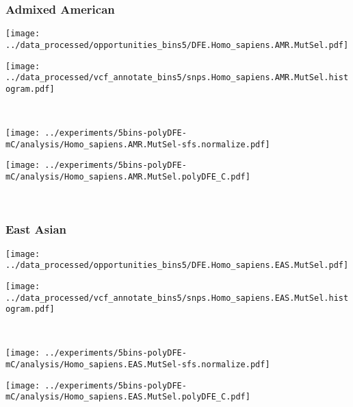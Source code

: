\subsubsection{Admixed American}

\begin{minipage}{0.49\linewidth}
    \texttt{[image: ../data\_processed/opportunities\_bins5/DFE.Homo\_sapiens.AMR.MutSel.pdf]}
\end{minipage}
\begin{minipage}{0.49\linewidth}
    \texttt{[image: ../data\_processed/vcf\_annotate\_bins5/snps.Homo\_sapiens.AMR.MutSel.histogram.pdf]}
\end{minipage}
\\
\begin{minipage}{0.49\linewidth}
    \texttt{[image: ../experiments/5bins-polyDFE-mC/analysis/Homo\_sapiens.AMR.MutSel-sfs.normalize.pdf]}
\end{minipage}
\begin{minipage}{0.49\linewidth}
    \texttt{[image: ../experiments/5bins-polyDFE-mC/analysis/Homo\_sapiens.AMR.MutSel.polyDFE\_C.pdf]}
\end{minipage}
\\

\subsubsection{East Asian}

\begin{minipage}{0.49\linewidth}
    \texttt{[image: ../data\_processed/opportunities\_bins5/DFE.Homo\_sapiens.EAS.MutSel.pdf]}
\end{minipage}
\begin{minipage}{0.49\linewidth}
    \texttt{[image: ../data\_processed/vcf\_annotate\_bins5/snps.Homo\_sapiens.EAS.MutSel.histogram.pdf]}
\end{minipage}
\\
\begin{minipage}{0.49\linewidth}
    \texttt{[image: ../experiments/5bins-polyDFE-mC/analysis/Homo\_sapiens.EAS.MutSel-sfs.normalize.pdf]}
\end{minipage}
\begin{minipage}{0.49\linewidth}
    \texttt{[image: ../experiments/5bins-polyDFE-mC/analysis/Homo\_sapiens.EAS.MutSel.polyDFE\_C.pdf]}
\end{minipage}
\\

